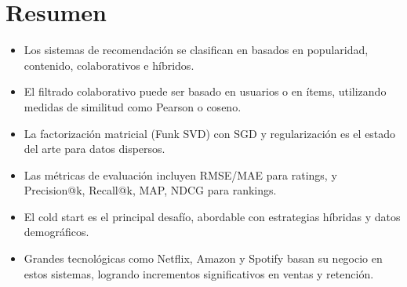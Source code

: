 \documentclass[12pt,a4paper,openany,oneside]{book}
\begin{document}
\section{Resumen}
\begin{itemize}
    \item Los sistemas de recomendación se clasifican en basados en popularidad, contenido, colaborativos e híbridos.
    \item El filtrado colaborativo puede ser basado en usuarios o en ítems, utilizando medidas de similitud como Pearson o coseno.
    \item La factorización matricial (Funk SVD) con SGD y regularización es el estado del arte para datos dispersos.
    \item Las métricas de evaluación incluyen RMSE/MAE para ratings, y Precision@k, Recall@k, MAP, NDCG para rankings.
    \item El cold start es el principal desafío, abordable con estrategias híbridas y datos demográficos.
    \item Grandes tecnológicas como Netflix, Amazon y Spotify basan su negocio en estos sistemas, logrando incrementos significativos en ventas y retención.
\end{itemize}
\end{document}
